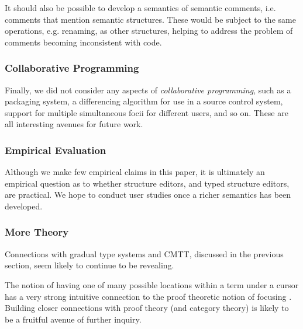 \documentclass[preprint,9pt]{sigplanconf}
\begin{document}
It should also be possible to develop a semantics of semantic comments, i.e. comments that mention semantic structures. These would be subject to the same operations, e.g. renaming, as other structures, helping to address the problem of comments becoming inconsistent with code.

\subsubsection{Collaborative Programming}
Finally, we did not consider any aspects of \emph{collaborative programming}, such as a packaging system, a differencing algorithm for use in a source control system, support for multiple simultaneous focii for different users, and so on. These are all interesting avenues for future work.

\subsubsection{Empirical Evaluation}
Although we make few empirical claims in this paper, it is ultimately an empirical question as to whether structure editors, and typed structure editors, are practical. We hope to conduct user studies once a richer semantics has been developed.

\subsubsection{More Theory}
Connections with gradual type systems and CMTT, discussed in the previous section, seem likely to continue to be revealing. 

The notion of having one of many possible locations within a term under a cursor has a very strong intuitive connection to the proof theoretic notion of focusing \cite{Simmons11tr}. Building closer connections with proof theory (and category theory) is likely to be a fruitful avenue of further inquiry. 






\end{document}
